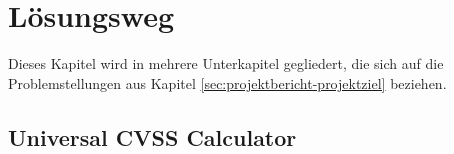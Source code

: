 \section{Lösungsweg} \label{sec:projektbericht-loesungsweg}

Dieses Kapitel wird in mehrere Unterkapitel gegliedert, die sich auf die Problemstellungen aus Kapitel \ref{sec:projektbericht-projektziel} beziehen.





\subsection{Universal CVSS Calculator} \label{subsec:projektbericht-loesungsweg-typescript-cvss-online-calculator}
